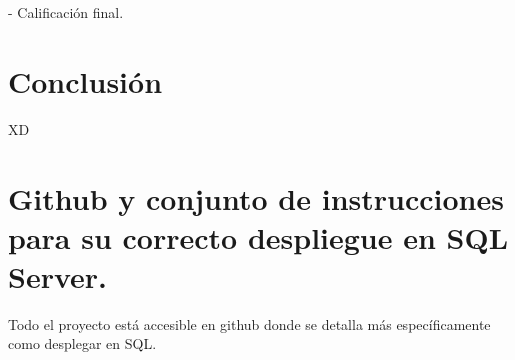 \documentclass[12pt, a4paper, twoside]{article}
\begin{document}
	- Calificación final.
	

	\section{Conclusión}
	
	XD


	\section{Github y conjunto de instrucciones para su correcto despliegue en SQL Server.}

	Todo el proyecto está accesible en github \cite{depab2024} donde se detalla más específicamente como desplegar en SQL.
	\printbibliography
	
	
	
	
\end{document}
